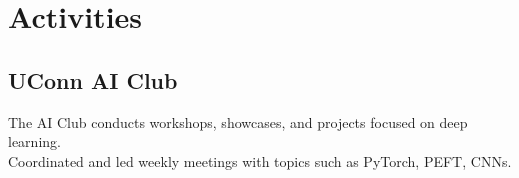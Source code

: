 \documentclass[]{resume-template}
\begin{document}
\begin{minipage}[t]{0.33\textwidth}

  \section{Activities}\label{sec:activities}

  \subsection{UConn AI Club}\label{subsec:uconn-ai-club}
  \textbullet{} The AI Club conducts workshops, showcases, and
  projects focused on deep learning. \\
  \textbullet{} Coordinated and led weekly meetings with topics such
  as PyTorch, PEFT, CNNs.

  \vspace{\topsep}




\end{minipage}
\end{document}
